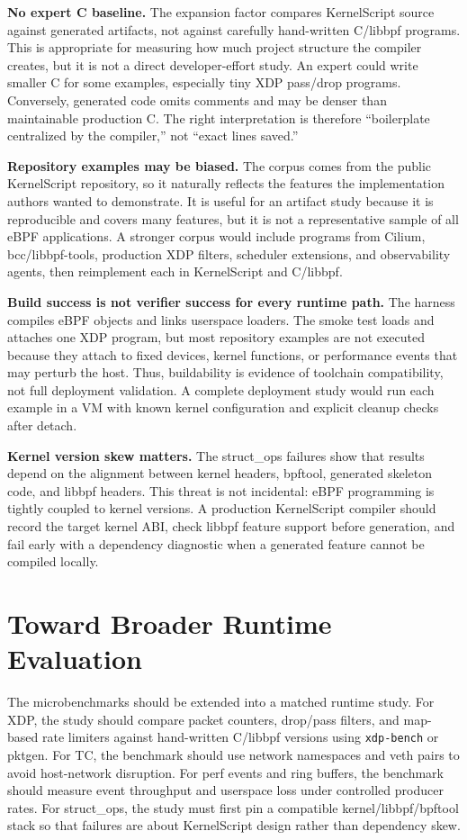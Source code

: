 \documentclass[10pt,twocolumn]{article}
\newcommand{\tool}{KernelScript}
\begin{document}
\textbf{No expert C baseline.}  The expansion factor compares \tool{} source
against generated artifacts, not against carefully hand-written C/libbpf
programs.  This is appropriate for measuring how much project structure the
compiler creates, but it is not a direct developer-effort study.  An expert
could write smaller C for some examples, especially tiny XDP pass/drop
programs.  Conversely, generated code omits comments and may be denser than
maintainable production C.  The right interpretation is therefore ``boilerplate
centralized by the compiler,'' not ``exact lines saved.''

\textbf{Repository examples may be biased.}  The corpus comes from the public
\tool{} repository, so it naturally reflects the features the implementation
authors wanted to demonstrate.  It is useful for an artifact study because it
is reproducible and covers many features, but it is not a representative sample
of all eBPF applications.  A stronger corpus would include programs from
Cilium, bcc/libbpf-tools, production XDP filters, scheduler extensions, and
observability agents, then reimplement each in \tool{} and C/libbpf.

\textbf{Build success is not verifier success for every runtime path.}  The
harness compiles eBPF objects and links userspace loaders.  The smoke test
loads and attaches one XDP program, but most repository examples are not
executed because they attach to fixed devices, kernel functions, or performance
events that may perturb the host.  Thus, buildability is evidence of toolchain
compatibility, not full deployment validation.  A complete deployment study
would run each example in a VM with known kernel configuration and explicit
cleanup checks after detach.

\textbf{Kernel version skew matters.}  The struct\_ops failures show that
results depend on the alignment between kernel headers, bpftool, generated
skeleton code, and libbpf headers.  This threat is not incidental: eBPF
programming is tightly coupled to kernel versions.  A production \tool{}
compiler should record the target kernel ABI, check libbpf feature support
before generation, and fail early with a dependency diagnostic when a generated
feature cannot be compiled locally.

\section{Toward Broader Runtime Evaluation}

The microbenchmarks should be extended into a matched runtime study.  For XDP,
the study should compare packet counters, drop/pass filters, and map-based rate
limiters against hand-written C/libbpf versions using \texttt{xdp-bench} or
pktgen.  For TC, the benchmark should use network namespaces and veth pairs to
avoid host-network disruption.  For perf events and ring buffers, the benchmark
should measure event throughput and userspace loss under controlled producer
rates.  For struct\_ops, the study must first pin a compatible
kernel/libbpf/bpftool stack so that failures are about \tool{} design rather
than dependency skew.
\end{document}
